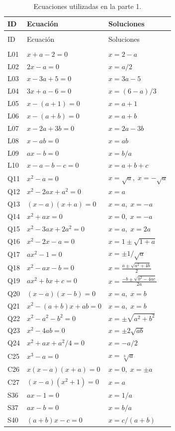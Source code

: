 \documentclass{article} \usepackage[utf8]{inputenc} \usepackage[spanish]{babel} \usepackage{amsmath, amssymb, amsthm} \usepackage{bm} \usepackage{float} \usepackage{longtable} \usepackage[hidelinks]{hyperref} \spanishdecimal{.}
\begin{document}
\begin{longtable}{lll} \caption{Ecuaciones utilizadas en la parte 1.}
\label{tab:equaciones_fase1} \\
\hline
ID & Ecuación & Soluciones \\
\hline \endfirsthead
\multicolumn{3}{c}{\textit{}} \\
\hline
ID & Ecuación & Soluciones \\
\hline \endhead \hline
\multicolumn{3}{r}{\textit{}} \\
\endfoot \hline \endlastfoot
L01 & $x + a - 2 = 0$ & $x = 2 - a$ \\
L02 & $2x - a = 0$ & $x = a/2$ \\
L03 & $x - 3a + 5 = 0$ & $x = 3a - 5$ \\
L04 & $3x + a - 6 = 0$ & $x = (6 - a)/3$ \\
L05 & $x - (a+1) = 0$ & $x = a + 1$ \\
L06 & $x - (a+b) = 0$ & $x = a + b$ \\
L07 & $x - 2a + 3b = 0$ & $x = 2a - 3b$ \\
L08 & $x - ab = 0$ & $x = ab$ \\
L09 & $ax - b = 0$ & $x = b/a$ \\
L10 & $x - a - b - c = 0$ & $x = a + b + c$ \\
Q11 & $x^2 - a = 0$ & $x = \sqrt{a},\; x = -\sqrt{a}$ \\
Q12 & $x^2 - 2ax + a^2 = 0$ & $x = a$ \\
Q13 & $(x - a)(x + a) = 0$ & $x = a,\; x = -a$ \\
Q14 & $x^2 + a x = 0$ & $x = 0,\; x = -a$ \\
Q15 & $x^2 - 3ax + 2a^2 = 0$ & $x = a,\; x = 2a$ \\
Q16 & $x^2 - 2x - a = 0$ & $x = 1 \pm \sqrt{1+a}$ \\
Q17 & $ax^2 - 1 = 0$ & $x = \pm 1/\sqrt{a}$ \\
Q18 & $x^2 - ax - b = 0$ & $x = \frac{a \pm \sqrt{a^2+4b}}{2}$ \\
Q19 & $ax^2 + bx + c = 0$ & $x = \frac{-b \pm \sqrt{b^2-4ac}}{2a}$ \\
Q20 & $(x-a)(x-b) = 0$ & $x = a,\; x = b$ \\
Q21 & $x^2 - (a+b)x + ab = 0$ & $x = a,\; x = b$ \\
Q22 & $x^2 - a^2 - b^2 = 0$ & $x = \pm\sqrt{a^2+b^2}$ \\
Q23 & $x^2 - 4ab = 0$ & $x = \pm 2\sqrt{ab}$ \\
Q24 & $x^2 + ax + a^2/4 = 0$ & $x = -a/2$ \\
C25 & $x^3 - a = 0$ & $x = \sqrt[3]{a}$ \\
C26 & $x(x-a)(x+a) = 0$ & $x = 0,\; x = \pm a$ \\
C27 & $(x-a)(x^2+1) = 0$ & $x = a$ \\
S36 & $a x - 1 = 0$ & $x = 1/a$ \\
S37 & $a x - b = 0$ & $x = b/a$ \\
S40 & $(a+b)x - c = 0$ & $x = c/(a+b)$ \\
\end{longtable}
\end{document}
